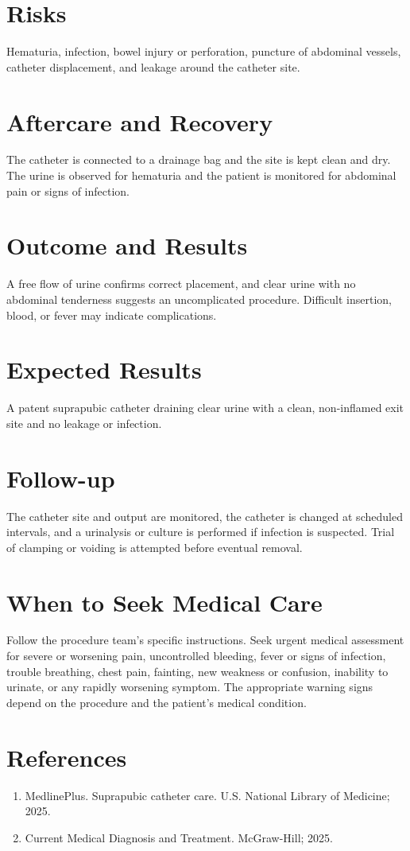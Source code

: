 \section*{Risks}
Hematuria, infection, bowel injury or perforation, puncture of abdominal vessels, catheter displacement, and leakage around the catheter site.

\section*{Aftercare and Recovery}
The catheter is connected to a drainage bag and the site is kept clean and dry. The urine is observed for hematuria and the patient is monitored for abdominal pain or signs of infection.
\section*{Outcome and Results}
A free flow of urine confirms correct placement, and clear urine with no abdominal tenderness suggests an uncomplicated procedure. Difficult insertion, blood, or fever may indicate complications.
\section*{Expected Results}
A patent suprapubic catheter draining clear urine with a clean, non-inflamed exit site and no leakage or infection.
\section*{Follow-up}
The catheter site and output are monitored, the catheter is changed at scheduled intervals, and a urinalysis or culture is performed if infection is suspected. Trial of clamping or voiding is attempted before eventual removal.
\section*{When to Seek Medical Care}
Follow the procedure team's specific instructions. Seek urgent medical assessment for severe or worsening pain, uncontrolled bleeding, fever or signs of infection, trouble breathing, chest pain, fainting, new weakness or confusion, inability to urinate, or any rapidly worsening symptom. The appropriate warning signs depend on the procedure and the patient's medical condition.

\section*{References}
\begin{enumerate}
  \item MedlinePlus. Suprapubic catheter care. U.S. National Library of Medicine; 2025.
  \item Current Medical Diagnosis and Treatment. McGraw-Hill; 2025.
\end{enumerate}

\clearpage
